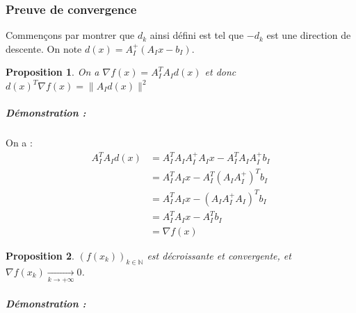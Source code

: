\documentclass[10pt,a4paper]{article}
\newtheorem{prop}{Proposition}
\begin{document}
\subsubsection{Preuve de convergence}

Commençons par montrer que $d_k$ ainsi défini est tel que $-d_k$ est une direction de descente.
On note $d(x)=A_I^+(A_I x -b_I)$.
\begin{prop}
On a $\nabla f(x) = A_I^T A_I d(x)$ et donc $d(x)^T \nabla f(x)=\| A_I d(x) \|^2$
\end{prop}
\subparagraph{Démonstration :}
On a :
\begin{equation}
\begin{aligned}
A_I^TA_Id(x)&=A_I^TA_IA_I^+A_Ix -A_I^TA_IA_I^+b_I \\
&=A_I^TA_Ix-A_I^T(A_I A_I^+)^T b_I \\
&=A_I^TA_Ix-(A_I A_I^+ A_I)^T b_I \\
&=A_I^T A_I x -A_I^T b_I \\
&= \nabla f(x)
\end{aligned}
\end{equation}
\begin{prop} $(f(x_k))_{k \in \mathbb{N}}$ est décroissante et convergente, et $\nabla f(x_k) \underset{k \rightarrow +\infty}{\rightarrow} 0$.
\end{prop}
\subparagraph{Démonstration :}
\end{document}
